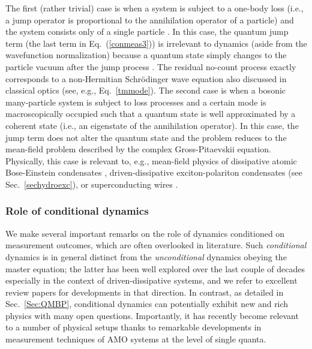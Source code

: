 \documentclass{tADP2e}
\theoremstyle{plain}
\theoremstyle{plain}
\theoremstyle{definition}
\begin{document}
The first (rather trivial) case is when a system is subject to a one-body loss (i.e., a jump operator is proportional to the annihilation operator of a particle) and the system consists only of a single particle \cite{DS15A}. In this case, the quantum jump term (the last term in Eq.~(\ref{conmeas3})) is irrelevant to dynamics (aside from the wavefunction normalization) because a quantum state simply changes to the particle vacuum after the jump process {\cite{GZ17}}. The residual no-count process exactly corresponds to  a non-Hermitian Schr{\"o}dinger wave equation also discussed in classical optics (see, e.g., Eq.~\eqref{tmmode}).   The second case is when a bosonic many-particle system is subject to loss processes and a certain mode is macroscopically occupied such that a quantum state is well approximated by a coherent state (i.e., an eigenstate of the annihilation operator). In this case, the jump term does not alter the quantum state and the problem reduces to the mean-field problem described by the complex Gross-Pitaevskii equation. Physically, this case is relevant to, e.g., mean-field physics of dissipative atomic Bose-Einstein condensates \cite{WP09,BG13,LR16}, driven-dissipative exciton-polariton condensates (see {Sec.~\ref{sechydroexc}}), or superconducting wires \cite{RJ07,NMC12}.


\subsubsection{Role of conditional dynamics}
\label{Sec:RCD}
We make several important remarks on the role of dynamics conditioned on measurement outcomes, which are often overlooked in literature. 
Such {\it conditional} dynamics is in general distinct from the {\it unconditional} dynamics obeying the master equation; the latter has been well explored over the last couple of decades especially in the context of driven-dissipative systems, and we refer to excellent review papers \cite{DH10,MM12,RH13,CI13,Sieberer_2016,WH19} for developments in that direction. In contrast, as detailed in Sec.~\ref{Sec:QMBP}, conditional dynamics can potentially exhibit new and rich physics with many open questions. Importantly, it has recently become relevant to a number of physical setups thanks to remarkable developments in measurement techniques of AMO systems at the level of single quanta.
\end{document}
